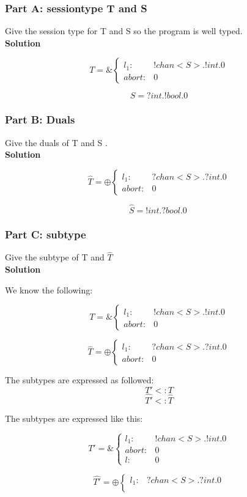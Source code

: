 \subsubsection{Part A: sessiontype T and S}

Give the session type for T and S so the program is well typed. \\

\textbf{Solution}

\[
T = \& \begin{cases}
    l_1: & !chan<S>.!int.0 \\
    abort: &  0
\end{cases}
\]

\[
S = ?int.!bool.0
\]

\subsubsection{Part B: Duals}

Give the duals of T and S . \\

\textbf{Solution}

\[
\hat{T} = \oplus \begin{cases}
    l_1: & ?chan<S>.?int.0 \\
    abort: &  0
\end{cases}
\]

\[
\hat{S} = !int.?bool.0\
\]

\subsubsection{Part C: subtype}

Give the subtype of T and $\hat{T}$ \\

\textbf{Solution}

We know the following: 

\[
T = \& \begin{cases}
    l_1: & !chan<S>.!int.0 \\
    abort: &  0
\end{cases}
\]


\[
\hat{T} = \oplus \begin{cases}
    l_1: & ?chan<S>.?int.0 \\
    abort: &  0
\end{cases}
\]

The subtypes are expressed as followed: 
\[T' <: T \]
\[\hat{T'} <: \hat{T} \]

The subtypes are expressed like this: 

\[
T' = \& \begin{cases}
    l_1: & !chan<S>.!int.0 \\
    abort: &  0 \\
    l: & 0
\end{cases}
\]


\[
\hat{T'} = \oplus \begin{cases}
    l_1: & ?chan<S>.?int.0 \\
\end{cases}
\]

